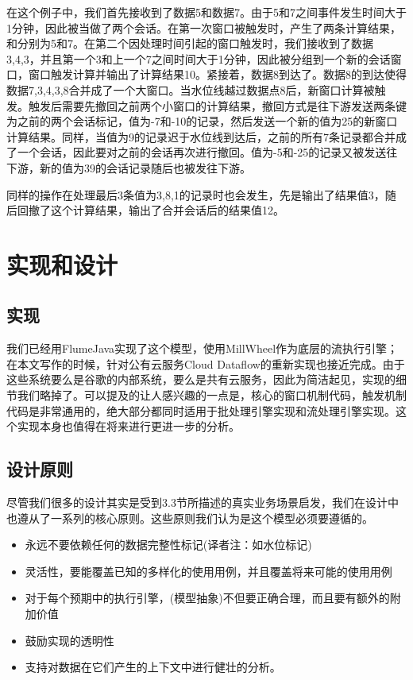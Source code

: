 \documentclass[oneside]{ctexbook}
\begin{document}
在这个例子中，我们首先接收到了数据5和数据7。由于5和7之间事件发生时间大于1分钟，因此被当做了两个会话。在第一次窗口被触发时，产生了两条计算结果，和分别为5和7。在第二个因处理时间引起的窗口触发时，我们接收到了数据3,4,3，并且第一个3和上一个7之间时间大于1分钟，因此被分组到一个新的会话窗口，窗口触发计算并输出了计算结果10。紧接着，数据8到达了。数据8的到达使得数据7,3,4,3,8合并成了一个大窗口。当水位线越过数据点8后，新窗口计算被触发。触发后需要先撤回之前两个小窗口的计算结果，撤回方式是往下游发送两条键为之前的两个会话标记，值为-7和-10的记录，然后发送一个新的值为25的新窗口计算结果。同样，当值为9的记录迟于水位线到达后，之前的所有7条记录都合并成了一个会话，因此要对之前的会话再次进行撤回。值为-5和-25的记录又被发送往下游，新的值为39的会话记录随后也被发往下游。

同样的操作在处理最后3条值为3,8,1的记录时也会发生，先是输出了结果值3，随后回撤了这个计算结果，输出了合并会话后的结果值12。

\section{实现和设计}

\subsection{实现}

我们已经用FlumeJava实现了这个模型，使用MillWheel作为底层的流执行引擎；在本文写作的时候，针对公有云服务Cloud Dataflow的重新实现也接近完成。由于这些系统要么是谷歌的内部系统，要么是共有云服务，因此为简洁起见，实现的细节我们略掉了。可以提及的让人感兴趣的一点是，核心的窗口机制代码，触发机制代码是非常通用的，绝大部分都同时适用于批处理引擎实现和流处理引擎实现。这个实现本身也值得在将来进行更进一步的分析。

\subsection{设计原则}

尽管我们很多的设计其实是受到3.3节所描述的真实业务场景启发，我们在设计中也遵从了一系列的核心原则。这些原则我们认为是这个模型必须要遵循的。

\begin{itemize}
\item 永远不要依赖任何的数据完整性标记(译者注：如水位标记)
\item 灵活性，要能覆盖已知的多样化的使用用例，并且覆盖将来可能的使用用例
\item 对于每个预期中的执行引擎，(模型抽象)不但要正确合理，而且要有额外的附加价值
\item 鼓励实现的透明性
\item 支持对数据在它们产生的上下文中进行健壮的分析。
\end{itemize}
\end{document}
